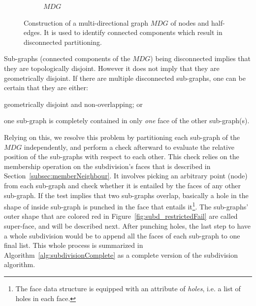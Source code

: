 \begin{figure}
\begin{subfigure}{.32\textwidth}
    \caption{$\mathit{MDG}$} \label{subfig:subd_mdg_c}
  \end{subfigure}%
  \caption[xxx]
          {Construction of a multi-directional graph $\mathit{MDG}$ of nodes and half-edges.
          It is used to identify connected components which result in disconnected partitioning.}
  \label{fig:subd_mdg}
\end{figure}

Sub-graphs (connected components of the $\mathit{MDG}$) being disconnected implies that they are topologically disjoint.
However it does not imply that they are geometrically disjoint.
If there are multiple disconnected sub-graphs, one can be certain that they are either:
\begin{inparaenum}
  \item geometrically disjoint and non-overlapping; or
  \item one sub-graph is completely contained in only \emph{one} face of the other sub-graph(s).
\end{inparaenum}
Relying on this, we resolve this problem by partitioning each sub-graph of the $\mathit{MDG}$ independently,
and perform a check afterward to evaluate the relative position of the sub-graphs with respect to each other.
This check relies on the membership operation on the subdivision's faces that is described in Section~\ref{subsec:memberNeighbour}.
It involves picking an arbitrary point (node) from each sub-graph and check whether it is entailed by the faces of any other sub-graph.
If the test implies that two sub-graphs overlap, basically a hole in the shape of inside sub-graph is punched in the face that entails it\footnote{The face data structure is equipped with an attribute of \emph{holes}, i.e. a list of holes in each face.}.
The sub-graphs' outer shape that are colored red in Figure~\ref{fig:subd_restrictedFail} are called super-face, and will be described next.
After punching holes, the last step to have a whole subdivision would be to append all the faces of each sub-graph to one final list.
This whole process is summarized in Algorithm~\ref{alg:subdivisionComplete} as a complete version of the subdivision algorithm.

